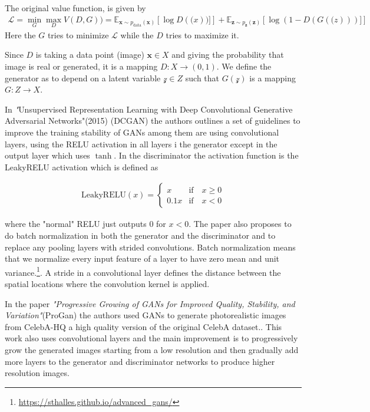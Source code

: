 The original value function, is given by
\begin{align}
\mathcal{L} = \min_G \max_D V(D,G))=\mathbb{E}_{\mathbf{x}\sim p_{\text{data}}(\mathbf{x})}
\left[\log D(\mathbf(x))]\right]+
\mathbb{E}_{\mathbf{z}\sim p_{\mathbf{z}}(\mathbf{z})}
\left[\log (1-D(G(\mathbf(z)))]\right]
\end{align}
Here the $G$ tries to minimize $\mathcal{L}$ while the $D$ tries to maximize it.

Since $D$ is taking a data point (image) $\mathbf{x}\in X$ and giving the probability that image is real or generated, it is a mapping $D:X \to (0,1)$. We define the generator as to depend on a latent variable $\mathcal{z}\in Z$ such that $G(\mathcal{z})$ is a mapping $G:Z\to X$.

In \textit"{Unsupervised Representation Learning with Deep Convolutional Generative Adversarial Networks"}(2015) (DCGAN)\cite{dcgan} the authors outlines a set of guidelines to improve the training stability of GANs among them are using convolutional layers, using the RELU activation in all layers i the generator except in the output layer which uses $\tanh$. In the discriminator the activation function is  the LeakyRELU activation which is defined as

\begin{align}
  \text{LeakyRELU}(x) =
  \begin{cases}
    x & \text{if}\quad x\geq0\\
    0.1x & \text{if}\quad x<0
  \end{cases}
\end{align}

where the "normal" RELU just outputs $0$ for $x<0$. The paper also proposes to do batch normalization in both the generator and the discriminator and to replace any pooling layers with strided convolutions. Batch normalization means that we normalize every input feature of a layer to have zero mean and unit variance.\footnote{\url{https://sthalles.github.io/advanced_gans/}}. A stride in a convolutional layer defines the distance between the spatial locations where the convolution kernel is applied.

In the paper \textit{"Progressive Growing of GANs for Improved Quality, Stability, and Variation"}(ProGan)\cite{progan} the authors used GANs to generate photorealistic images from CelebA-HQ a high quality version of the original CelebA dataset.\cite{celebA}. This work also uses convolutional layers and the main improvement is to progressively grow the generated images starting from a low resolution and then gradually add more layers to the generator and discriminator networks to produce higher resolution images.

